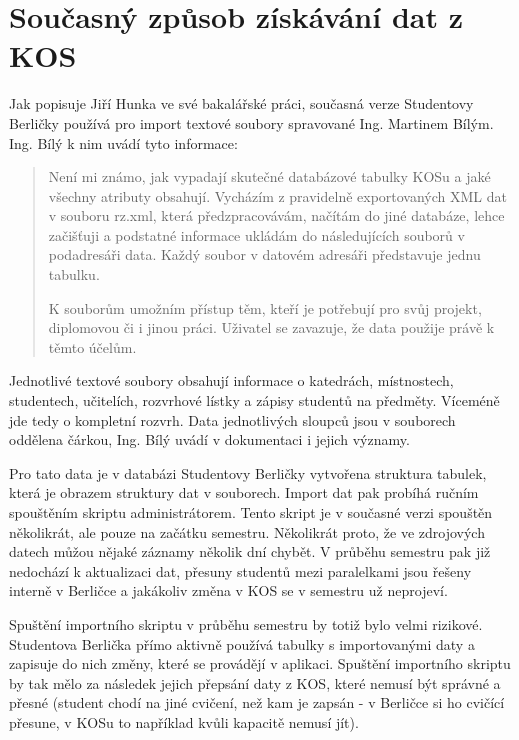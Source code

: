 \documentclass[11pt,twoside,a4paper]{book}
\begin{document}
\section{Současný způsob získávání dat z KOS}
Jak popisuje Jiří Hunka ve své bakalářské práci\cite{hunka:bp}, současná verze Studentovy Berličky používá pro import textové soubory spravované Ing. Martinem Bílým. Ing. Bílý k nim uvádí tyto informace:

\begin{quotation}
Není mi známo, jak vypadají skutečné databázové tabulky KOSu a jaké všechny atributy obsahují. Vycházím z pravidelně exportovaných XML dat v souboru rz.xml, která předzpracovávám, načítám do jiné databáze, lehce začišťuji a podstatné informace ukládám do následujících souborů v podadresáři data. Každý soubor v datovém adresáři představuje jednu tabulku.

K souborům umožním přístup těm, kteří je potřebují pro svůj projekt, diplomovou či i jinou práci. Uživatel se zavazuje, že data použije právě k těmto účelům.
\end{quotation}

Jednotlivé textové soubory obsahují informace o katedrách, místnostech, studentech, učitelích, rozvrhové lístky a zápisy studentů na předměty. Víceméně jde tedy o kompletní rozvrh. Data jednotlivých sloupců jsou v souborech oddělena čárkou, Ing. Bílý uvádí v dokumentaci i jejich významy.

Pro tato data je v databázi Studentovy Berličky vytvořena struktura tabulek, která je obrazem struktury dat v souborech. Import dat pak probíhá ručním spouštěním skriptu administrátorem. Tento skript je v současné verzi spouštěn několikrát, ale pouze na začátku semestru. Několikrát proto, že ve zdrojových datech můžou nějaké záznamy několik dní chybět. V průběhu semestru pak již nedochází k aktualizaci dat, přesuny studentů mezi paralelkami jsou řešeny interně v Berličce a jakákoliv změna v KOS se v semestru už neprojeví.

Spuštění importního skriptu v průběhu semestru by totiž bylo velmi rizikové. Studentova Berlička přímo aktivně používá tabulky s importovanými daty a zapisuje do nich změny, které se provádějí v aplikaci. Spuštění importního skriptu by tak mělo za následek jejich přepsání daty z KOS, které nemusí být správné a přesné (student chodí na jiné cvičení, než kam je zapsán - v Berličce si ho cvičící přesune, v KOSu to například kvůli kapacitě nemusí jít).
\end{document}
